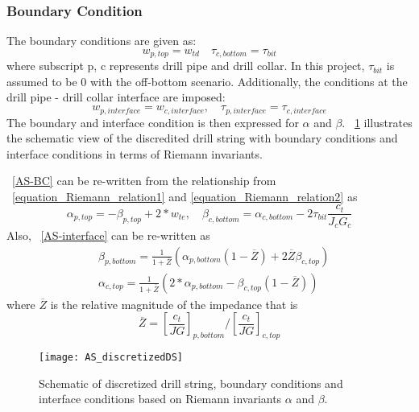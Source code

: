 \subsubsection{Boundary Condition}
The boundary conditions are given as:
\begin{equation}\label{AS-BC}
  w_{p,top} = w_{td} \quad \tau_{c,bottom} = \tau_{bit}
\end{equation}
where subscript p, c represents drill pipe and drill collar. In this project, $\tau_{bit}$ is assumed to be 0 with the off-bottom scenario.
Additionally, the conditions at the drill pipe - drill collar interface are imposed:
\begin{equation}\label{AS-interface}
  w_{p,interface} = w_{c,interface}, \quad \tau_{p,interface} = \tau_{c,interface}
\end{equation}
The boundary and interface condition is then expressed for $\alpha$ and $\beta$. \figurename~\ref{AS_discretizeDS} illustrates the schematic view of the discredited drill string with boundary conditions and interface conditions in terms of Riemann invariants.

\equationname~\ref{AS-BC} can be re-written from the relationship from \equationname~\ref{equation_Riemann_relation1} and \ref{equation_Riemann_relation2} as
\begin{equation}\label{AS-riemannBC}
  \alpha_{p,top} = -\beta_{p,top} + 2*w_{te}, \quad \beta_{c,bottom} = \alpha_{c,bottom} - 2\tau_{bit} \frac{c_t}{J_c G_c}
\end{equation}
Also, \equationname~\ref{AS-interface} can be re-written as
\begin{equation}\label{AS-riemanninterface}
\begin{split}
    & \beta_{p,bottom} = \frac{1}{1+\overline{Z}}\left(\alpha_{p,bottom}(1-\overline{Z}) + 2\overline{Z}\beta_{c,top} \right) \\
    & \alpha_{c,top} = \frac{1}{1+\overline{Z}}\left(2*\alpha_{p,bottom} - \beta_{c,top}(1-\overline{Z})\right)
\end{split}
\end{equation}
where $\overline{Z}$ is the relative magnitude of the impedance that is
\begin{equation}\label{AS_Zbar}
  \overline{Z} = \left[\frac{c_t}{JG}\right]_{p,bottom} / \left[\frac{c_t}{JG}\right]_{c,top}
\end{equation}
\begin{figure}
  \centering
  \texttt{[image: AS\_discretizedDS]}
  \caption[Schematic of discretized drill string and boundary conditions]{Schematic of discretized drill string, boundary conditions and interface conditions based on Riemann invariants $\alpha$ and $\beta$.}\label{AS_discretizeDS}
\end{figure}

